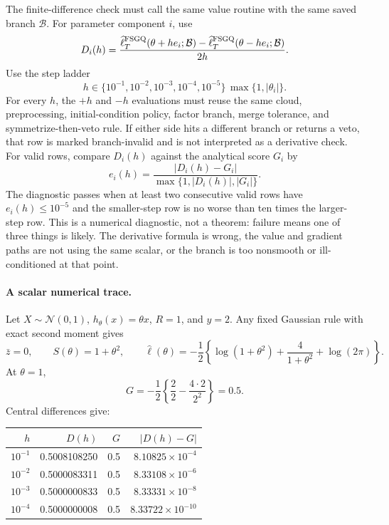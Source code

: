 \documentclass[11pt]{article}
\numberwithin{equation}{section}
\newcommand{\N}{\mathcal N}
\newcommand{\ellhat}{\widehat\ell}
\begin{document}
The finite-difference check must call the same value routine with the same
saved branch \(\mathcal B\).  For parameter component \(i\), use
\begin{equation}
  D_i(h)
  =
  \frac{
  \ellhat_T^{\rm FSGQ}(\theta+he_i;\mathcal B)
  -
  \ellhat_T^{\rm FSGQ}(\theta-he_i;\mathcal B)}
  {2h}.
  \label{eq:p31-central-diff}
\end{equation}
Use the step ladder
\begin{equation}
  h\in\{10^{-1},10^{-2},10^{-3},10^{-4},10^{-5}\}\,
  \max\{1,|\theta_i|\}.
  \label{eq:p31-fd-ladder}
\end{equation}
For every \(h\), the \(+\!h\) and \(-\!h\) evaluations must reuse the same
cloud, preprocessing, initial-condition policy, factor branch, merge tolerance,
and symmetrize-then-veto rule.  If either side hits a different branch or
returns a veto, that row is marked branch-invalid and is not interpreted as a
derivative check.  For valid rows, compare \(D_i(h)\) against the analytical
score \(G_i\) by
\begin{equation}
  e_i(h)=
  \frac{|D_i(h)-G_i|}
  {\max\{1,|D_i(h)|,|G_i|\}}.
  \label{eq:p31-fd-relative-error}
\end{equation}
The diagnostic passes when at least two consecutive valid rows have
\(e_i(h)\le 10^{-5}\) and the smaller-step row is no worse than ten times the
larger-step row.  This is a numerical diagnostic, not a theorem: failure means
one of three things is likely.  The derivative formula is wrong, the value and
gradient paths are not using the same scalar, or the branch is too nonsmooth or
ill-conditioned at that point.

\paragraph{A scalar numerical trace.}
Let \(X\sim\N(0,1)\), \(h_\theta(x)=\theta x\), \(R=1\), and \(y=2\).  Any
fixed Gaussian rule with exact second moment gives
\begin{equation}
  \bar z=0,\qquad S(\theta)=1+\theta^2,\qquad
  \ellhat(\theta)
  =
  -\frac12\left\{\log(1+\theta^2)+\frac{4}{1+\theta^2}+\log(2\pi)\right\}.
  \label{eq:p31-fd-toy-likelihood}
\end{equation}
At \(\theta=1\),
\begin{equation}
  G
  =
  -\frac12
  \left\{
  \frac{2}{2}
  -
  \frac{4\cdot2}{2^2}
  \right\}
  =
  0.5.
  \label{eq:p31-fd-toy-gradient}
\end{equation}
Central differences give:
\begin{center}
\begin{tabular}{rrrr}
\toprule
\(h\) & \(D(h)\) & \(G\) & \(|D(h)-G|\) \\
\midrule
\(10^{-1}\) & 0.5008108250 & 0.5 & \(8.10825\times10^{-4}\) \\
\(10^{-2}\) & 0.5000083311 & 0.5 & \(8.33108\times10^{-6}\) \\
\(10^{-3}\) & 0.5000000833 & 0.5 & \(8.33331\times10^{-8}\) \\
\(10^{-4}\) & 0.5000000008 & 0.5 & \(8.33722\times10^{-10}\) \\
\bottomrule
\end{tabular}
\end{center}
\end{document}
